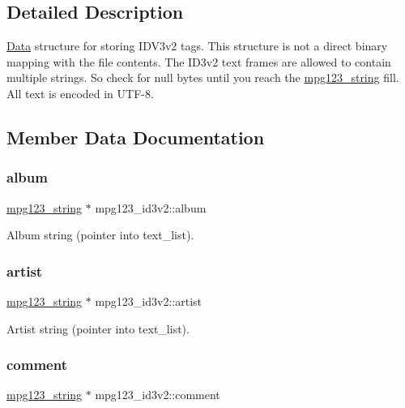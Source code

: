 \subsection{Detailed Description}
\hyperlink{classData}{Data} structure for storing I\+D\+V3v2 tags. This structure is not a direct binary mapping with the file contents. The I\+D3v2 text frames are allowed to contain multiple strings. So check for null bytes until you reach the \hyperlink{structmpg123__string}{mpg123\+\_\+string} fill. All text is encoded in U\+T\+F-\/8. 

\subsection{Member Data Documentation}
\mbox{\label{structmpg123__id3v2_a9d22870f444b06491711047e791d6385}} 
\subsubsection{\texorpdfstring{album}{album}}
{\footnotesize\ttfamily \hyperlink{structmpg123__string}{mpg123\+\_\+string} $\ast$ mpg123\+\_\+id3v2\+::album}

Album string (pointer into text\+\_\+list). \mbox{\label{structmpg123__id3v2_a8a9e75b7fd09312bd42fab5617a02981}} 
\subsubsection{\texorpdfstring{artist}{artist}}
{\footnotesize\ttfamily \hyperlink{structmpg123__string}{mpg123\+\_\+string} $\ast$ mpg123\+\_\+id3v2\+::artist}

Artist string (pointer into text\+\_\+list). \mbox{\label{structmpg123__id3v2_a6d8769e0a75c0fb81276b1a410070a44}} 
\subsubsection{\texorpdfstring{comment}{comment}}
{\footnotesize\ttfamily \hyperlink{structmpg123__string}{mpg123\+\_\+string} $\ast$ mpg123\+\_\+id3v2\+::comment}

